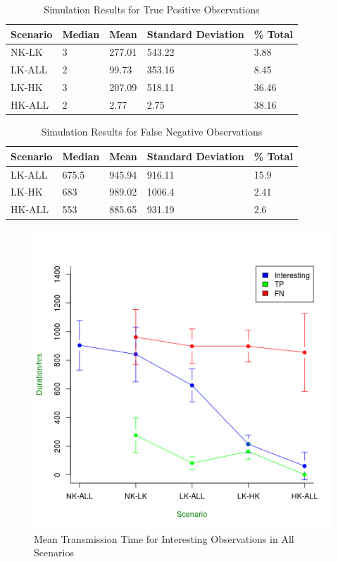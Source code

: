 \begin{table}[h]\footnotesize
\begin{tabularx}{\textwidth}{ |X|X|X|X|X|}
\hline
Scenario & Median & Mean & Standard Deviation & \% Total\\
\hline
NK-LK & 3 & 277.01 & 543.22 & 3.88\\
LK-ALL & 2 & 99.73 & 353.16 & 8.45\\
LK-HK & 3 & 207.09 & 518.11 & 36.46\\
HK-ALL & 2 & 2.77 & 2.75 & 38.16\\
\hline
\end{tabularx}
\caption{Simulation Results for True Positive Observations}\label{tab:observ_tp}
\end{table}

\begin{table}[h]\footnotesize
\begin{tabularx}{\textwidth}{ |X|X|X|X|X|}
\hline
Scenario & Median & Mean & Standard Deviation & \% Total\\
\hline
LK-ALL & 675.5 & 945.94 & 916.11 & 15.9\\ 
LK-HK & 683 & 989.02 & 1006.4 & 2.41\\
HK-ALL & 553 & 885.65 & 931.19 & 2.6\\
\hline
\end{tabularx}
\caption{Simulation Results for False Negative Observations}\label{tab:observ_fn}
\end{table}

\begin{figure}[h]
\centering
\includegraphics[width=\textwidth]{Chap7/figures/all_int.png}
\caption{Mean Transmission Time for Interesting Observations in All Scenarios}
\label{fig:all_int}
\end{figure}

